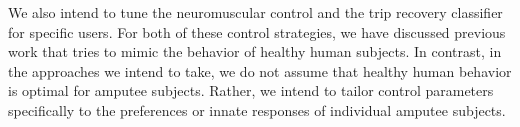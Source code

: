 We also intend to tune the neuromuscular control and the trip recovery
classifier for specific users. For both of these control strategies, we have
discussed previous work that tries to mimic the behavior of healthy human
subjects. In contrast, in the approaches we intend to take, we do not assume
that healthy human behavior is optimal for amputee subjects. Rather, we intend
to tailor control parameters specifically to the preferences or innate responses
of individual amputee subjects.

